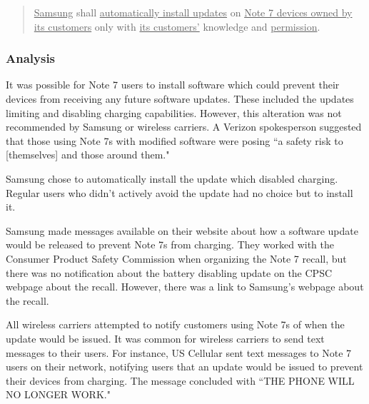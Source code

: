 \documentclass[12pt]{article}
\newcounter{subsubsubsection}[subsubsection]
\begin{document}
\begin{quote}
\uline{Samsung} shall \uline{automatically install updates} on \uline{Note 7 devices owned by its customers} only with \uline{its customers'} knowledge and \uline{permission}.
\end{quote}

\subsubsection{Analysis}


It was possible for Note 7 users to install software which could prevent their devices from receiving any future software updates\cite{youtubeGuideDisableUpdates}. These included the updates limiting and disabling charging capabilities. However, this alteration was not recommended by Samsung or wireless carriers. A Verizon spokesperson suggested that those using Note 7s with modified software were posing ``a safety risk to [themselves] and those around them."\cite{fortuneCustomersWontSurrenderPhones}

Samsung chose to automatically install the update which disabled charging\cite{youtubeGuideDisableUpdates}. Regular users who didn't actively avoid the update had no choice but to install it.

\label{sec:Analysis.2.03.Analysis.Customers' Knowledge}

Samsung made messages available on their website about how a software update would be released to prevent Note 7s from charging\cite{samsungFullRecallAnnounce}. They worked with the Consumer Product Safety Commission when organizing the Note 7 recall, but there was no notification about the battery disabling update on the CPSC webpage about the recall\cite{CPSC}. However, there was a link to Samsung's webpage about the recall\cite{samsungFullRecallAnnounce}.

All wireless carriers attempted to notify customers using Note 7s of when the update would be issued. It was common for wireless carriers to send text messages to their users\cite{bgrCarriersRecallMessages}. For instance, US Cellular sent text messages to Note 7 users on their network, notifying users that an update would be issued to prevent their devices from charging. The message concluded with ``THE PHONE WILL NO LONGER WORK."\cite{pocketnowNoLongerWorkMessageUSCellular}
\end{document}
